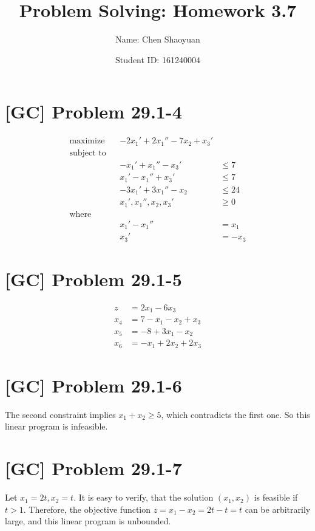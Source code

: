 \documentclass[a4paper,11pt,twocolumn]{article}
\newcommand{\homeworkno}{3.7}
\begin{document}
  \title{Problem Solving: Homework \homeworkno}
  \author{Name: Chen Shaoyuan \and Student ID: 161240004}
  \maketitle

  \section{[GC] Problem 29.1-4}
  \begin{align*}
    \text{maximize} && -2x_1'  +  2x_1''  -  7x_2  +  x_3' \\
    \text{subject to} \\
    && -x_1'  +  x_1''  -  x_3'  &\leq  7 \\
    && x_1'  -  x_1''  +  x_3'  &\leq  7 \\
    && -3x_1'  +  3x_1''  -  x_2  &\leq  24 \\
    && x_1',  x_1'',  x_2,  x_3'  &\geq  0\\
    \text{where}  \\
    && x_1' - x_1'' &= x_1\\
    && x_3' &= -x_3
  \end{align*}

  \section{[GC] Problem 29.1-5}
  \begin{align*}
    z & = 2x_1 - 6x_3 \\
    x_4 &= 7 - x_1 - x_2 + x_3 \\
    x_5 &= -8 + 3x_1 - x_2\\
    x_6 &= -x_1 + 2x_2 + 2x_3
  \end{align*}

  \section{[GC] Problem 29.1-6}
  The second constraint implies $x_1 + x_2 \geq 5$, which contradicts the first one. So this linear program is infeasible.

  \section{[GC] Problem 29.1-7}
  Let $x_1 = 2t, x_2 = t$. It is easy to verify, that the solution $(x_1, x_2)$ is feasible if $t>1$. Therefore, the objective function $z = x_1 - x_2 = 2t - t  = t$ can be arbitrarily large, and this linear program is unbounded.
\end{document}
